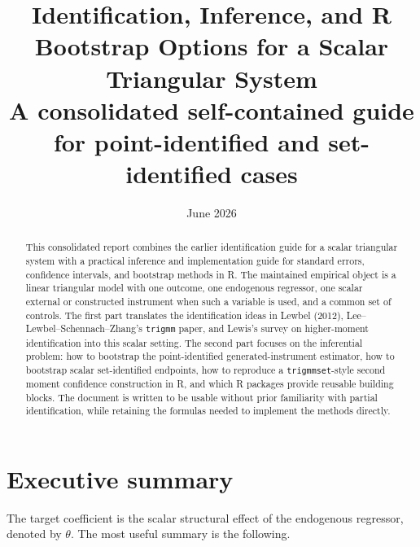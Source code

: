 \documentclass[11pt]{article}
\title{Identification, Inference, and R Bootstrap Options for a Scalar Triangular System\\
\large A consolidated self-contained guide for point-identified and set-identified cases}
\author{}
\date{June 2026}
\theoremstyle{plain}
\theoremstyle{definition}
\theoremstyle{remark}
\begin{document}
\maketitle


\begin{abstract}
This consolidated report combines the earlier identification guide for a scalar
triangular system with a practical inference and implementation guide for
standard errors, confidence intervals, and bootstrap methods in R.  The maintained
empirical object is a linear triangular model with one outcome, one endogenous
regressor, one scalar external or constructed instrument when such a variable is
used, and a common set of controls.  The first part translates the identification
ideas in Lewbel (2012), Lee--Lewbel--Schennach--Zhang's \texttt{trigmm} paper,
and Lewis's survey on higher-moment identification into this scalar setting.  The
second part focuses on the inferential problem: how to bootstrap the
point-identified generated-instrument estimator, how to bootstrap scalar
set-identified endpoints, how to reproduce a \texttt{trigmmset}-style second
moment confidence construction in R, and which R packages provide reusable
building blocks.  The document is written to be usable without prior familiarity
with partial identification, while retaining the formulas needed to implement the
methods directly.
\end{abstract}

\tableofcontents

\section{Executive summary}
\label{sec:exec}

The target coefficient is the scalar structural effect of the endogenous
regressor, denoted by $\theta$. The most useful summary is the following.
\end{document}
